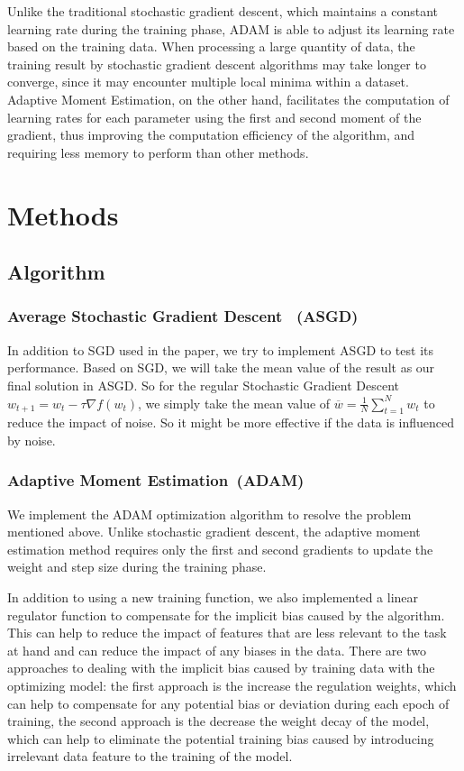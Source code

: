 Unlike the traditional stochastic gradient descent, which maintains a constant learning rate during the training phase, ADAM is able to adjust its learning rate based on the training data. When processing a large quantity of data, the training result by stochastic gradient descent algorithms may take longer to converge, since it may encounter multiple local minima within a dataset. Adaptive Moment Estimation, on the other hand, facilitates the computation of learning rates for each parameter using the first and second moment of the gradient, thus improving the computation efficiency of the algorithm, and requiring less memory to perform than other methods. 

\chapter{Methods}

\section{Algorithm}

\subsection{Average Stochastic Gradient Descent \ (ASGD)}
In addition to SGD used in the paper, we try to implement ASGD to test its performance. Based on SGD, we will take the mean value of the result as our final solution in ASGD. So for the regular Stochastic Gradient Descent $ w_{t+1} = w_t - \tau \nabla f(w_t) $, we simply take the mean value of $ \overline{w} = \frac{1}{N} \sum_{t=1}^{N} w_t $ to reduce the impact of noise. So it might be more effective if the data is influenced by noise.

\subsection{Adaptive Moment Estimation\ (ADAM)}
We implement the ADAM optimization algorithm to resolve the problem mentioned above. Unlike stochastic gradient descent, the adaptive moment estimation method requires only the first and second gradients to update the weight and step size during the training phase. 

In addition to using a new training function, we also implemented a linear regulator function to compensate for the implicit bias caused by the algorithm. This can help to reduce the impact of features that are less relevant to the task at hand and can reduce the impact of any biases in the data. There are two approaches to dealing with the implicit bias caused by training data with the optimizing model: the first approach is the increase the regulation weights, which can help to compensate for any potential bias or deviation during each epoch of training, the second approach is the decrease the weight decay of the model, which can help to eliminate the potential training bias caused by introducing irrelevant data feature to the training of the model. 


